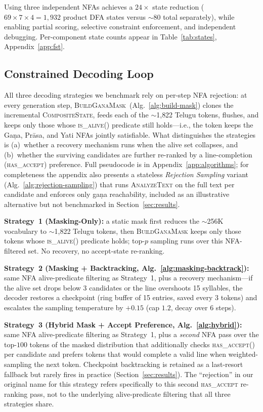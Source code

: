 \documentclass[11pt]{article}
\begin{document}
Using three independent NFAs achieves a $24\times$ state reduction
($69 \times 7 \times 4 = 1{,}932$ product DFA states versus $\sim$80
total separately), while enabling partial scoring, selective constraint
enforcement, and independent debugging. Per-component state counts
appear in Table~\ref{tab:states}, Appendix~\ref{app:fst}.

\subsection{Constrained Decoding Loop}
\label{sec:constrained_loop}

All three decoding strategies we benchmark rely on per-step NFA
rejection: at every generation step,
\textsc{BuildGanaMask}~(Alg.~\ref{alg:build-mask}) clones the
incremental \textsc{CompositeState}, feeds each of the $\sim$1{,}822
Telugu tokens, flushes, and keeps only those whose
\textsc{is\_alive()} predicate still holds---i.e., the token keeps the
Ga\d{n}a, Pr\=asa, and Yati NFAs jointly satisfiable. What
distinguishes the strategies is (a)~whether a recovery mechanism runs
when the alive set collapses, and (b)~whether the surviving candidates
are further re-ranked by a line-completion (\textsc{has\_accept})
preference. Full pseudocode is in Appendix~\ref{app:algorithms}; for
completeness the appendix also presents a stateless \emph{Rejection
Sampling} variant (Alg.~\ref{alg:rejection-sampling}) that runs
\textsc{AnalyzeText} on the full text per candidate and enforces only
ga\d{n}a reachability, included as an illustrative alternative but not
benchmarked in Section~\ref{sec:results}.

\textbf{Strategy~1 (Masking-Only):} a static mask first reduces the
$\sim$256K vocabulary to $\sim$1{,}822 Telugu tokens, then
\textsc{BuildGanaMask} keeps only those tokens whose
\textsc{is\_alive()} predicate holds; top-$p$ sampling runs over this
NFA-filtered set. No recovery, no accept-state re-ranking.

\textbf{Strategy~2 (Masking + Backtracking,
Alg.~\ref{alg:masking-backtrack}):} same NFA alive-predicate filtering
as Strategy~1, plus a recovery mechanism---if the alive set drops below
3 candidates or the line overshoots 15 syllables, the decoder
restores a checkpoint (ring buffer of 15 entries, saved every 3 tokens)
and escalates the sampling temperature by $+0.15$ (cap $1.2$, decay
over 6 steps).

\textbf{Strategy~3 (Hybrid Mask + Accept Preference,
Alg.~\ref{alg:hybrid}):} same NFA alive-predicate filtering as
Strategy~1, plus a \emph{second} NFA pass over the top-$100$ tokens of
the masked distribution that additionally checks
\textsc{has\_accept()} per candidate and prefers tokens that would
complete a valid line when weighted-sampling the next token.
Checkpoint backtracking is retained as a last-resort fallback but
rarely fires in practice (Section~\ref{sec:results}). The ``rejection''
in our original name for this strategy refers specifically to this
second \textsc{has\_accept} re-ranking pass, not to the underlying
alive-predicate filtering that all three strategies share.
\end{document}
